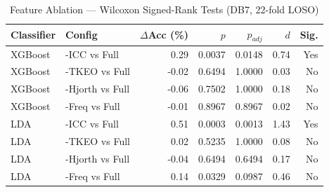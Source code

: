 \begin{table}[htbp]
\centering
\caption{Feature Ablation --- Wilcoxon Signed-Rank Tests (DB7, 22-fold LOSO)}
\label{tab:feature_stats}
\begin{tabular}{llrrrrr}
\toprule
Classifier & Config & $\Delta$Acc (\%) & $p$ & $p_{adj}$ & $d$ & Sig. \\
\midrule
XGBoost & {-ICC} vs Full & 0.29 & 0.0037 & 0.0148 & 0.74 & Yes \\
XGBoost & {-TKEO} vs Full & -0.02 & 0.6494 & 1.0000 & 0.03 & No \\
XGBoost & {-Hjorth} vs Full & -0.06 & 0.7502 & 1.0000 & 0.18 & No \\
XGBoost & {-Freq} vs Full & -0.01 & 0.8967 & 0.8967 & 0.02 & No \\
\midrule
LDA & {-ICC} vs Full & 0.51 & 0.0003 & 0.0013 & 1.43 & Yes \\
LDA & {-TKEO} vs Full & 0.02 & 0.5235 & 1.0000 & 0.08 & No \\
LDA & {-Hjorth} vs Full & -0.04 & 0.6494 & 0.6494 & 0.17 & No \\
LDA & {-Freq} vs Full & 0.14 & 0.0329 & 0.0987 & 0.46 & No \\
\bottomrule
\end{tabular}
\end{table}
